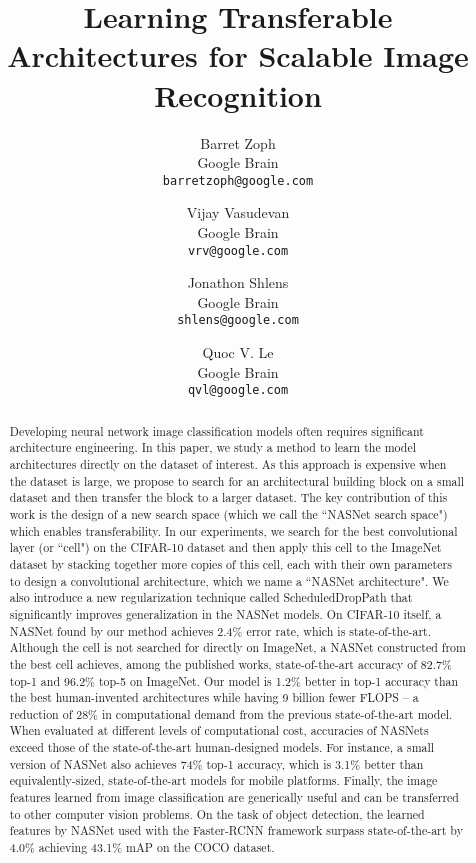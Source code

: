 \documentclass[10pt,twocolumn,letterpaper]{article}
\begin{document}
\title{Learning Transferable Architectures for Scalable Image Recognition}

\author{Barret Zoph\\
Google Brain\\
{\tt\small barretzoph@google.com}
\and
Vijay Vasudevan\\
Google Brain\\
{\tt\small vrv@google.com}
\and
Jonathon Shlens\\
Google Brain\\
{\tt\small shlens@google.com}
\and
Quoc V. Le\\
Google Brain\\
{\tt\small qvl@google.com}
}

\maketitle

\begin{abstract}
 
 
 Developing neural network image classification models often requires significant architecture engineering.  In this paper, we study a method to learn the model architectures directly on the dataset of interest. As this approach is expensive when the dataset is large, we propose to search for an architectural building block on a small dataset and then transfer the block to a larger dataset. The key contribution of this work is the design of a new search space (which we call the ``NASNet search space") which enables transferability.
 In our experiments, we search for the best convolutional layer (or ``cell") on the CIFAR-10 dataset and then apply this cell to the ImageNet dataset by stacking together more copies of this cell, each with their own parameters to design a convolutional architecture, which we name a ``NASNet architecture". We also introduce a new regularization technique called ScheduledDropPath that significantly improves generalization in the NASNet models. On CIFAR-10 itself, a NASNet found by our method achieves 2.4\% error rate, which is state-of-the-art. Although the cell is not searched for directly on ImageNet, a NASNet constructed from the best cell achieves, among the published works, state-of-the-art accuracy of 82.7\% top-1 and 96.2\% top-5 on ImageNet. Our model is 1.2\% better in top-1 accuracy than the best human-invented architectures while having 9 billion fewer FLOPS -- a reduction of 28\% in computational demand from the previous state-of-the-art model.  When evaluated at different levels of computational cost, accuracies of NASNets exceed those of the state-of-the-art human-designed models. For instance, a small version of NASNet also achieves 74\% top-1 accuracy, which is 3.1\% better than equivalently-sized, state-of-the-art models for mobile platforms.
 Finally, the image features learned from image classification are generically useful and can be transferred to other computer vision problems. On the task of object detection, the learned features by NASNet used with the Faster-RCNN framework surpass state-of-the-art by 4.0\% achieving 43.1\% mAP on the COCO dataset.
  
  \end{abstract}
\end{document}
